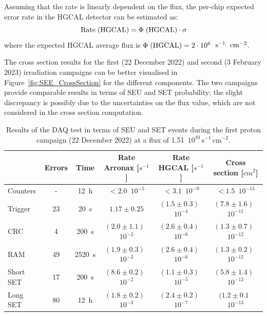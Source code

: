 Assuming that the rate is linearly dependent on the flux, the per-chip expected error rate in the HGCAL detector can be estimated as:
\begin{equation}
    \textnormal{Rate}\;(\textnormal{HGCAL}) = \Phi\;(\textnormal{HGCAL}) \cdot \sigma
\end{equation}
where the expected HGCAL average flux is $\Phi\;(\textnormal{HGCAL})=2\cdot10^6$~$\textnormal{s}^{-1}$~$\textnormal{cm}^{-2}$.

The cross section results for the first (22 December 2022) and second (3 February 2023) irradiation campaigns can be better visualised in Figure~\ref{fig:SEE_CrossSection} for the different components. The two campaigns provide comparable results in terms of SEU and SET probability; the slight discrepancy is possibly due to the uncertainties on the flux value, which are not considered in the cross section computation.

\begin{table}
    \centering
    \begin{tabular}{ l | c | c | c | c | c }
        \hline
        \hline
        & Errors & Time & Rate Arronax [$s^{-1}$] & Rate HGCAL [$s^{-1}$] & Cross section [$cm^{2}$]\\
        \hline
        Counters & - & 12~h & $<2.0$~$10^{-5}$ & $<3.1$~$10^{-9}$ & $<1.5$~$10^{-15}$\\
        Trigger & 23 & 20~s & $1.17\pm0.25$ & $(1.5\pm0.3)$~$10^{-4}$ & $(7.8\pm1.6)$~$10^{-11}$ \\
        CRC & 4 & 200~s & $(2.0\pm1.1)$~$10^{-2}$ & $(2.6\pm0.4)$~$10^{-6}$ & $(1.3\pm0.7)$~$10^{-12}$\\
        RAM & 49 & 2520~s & $(1.9\pm0.3)$~$10^{-2}$ & $(2.6\pm0.4)$~$10^{-6}$ & $(1.3\pm0.2)$~$10^{-12}$\\
        Short SET & 17 & 200~s & $(8.6\pm0.2)$~$10^{-2}$ & $(1.1\pm0.3)$~$10^{-5}$ & $(5.8\pm1.4)$~$10^{-12}$ \\
        Long SET & 80 & 12~h & $(1.8\pm0.2)$~$10^{-3}$ & $(2.4\pm0.2)$~$10^{-7}$ & $(1.2\pm0.1$~$10^{-13}$ \\
        \hline
        \hline
    \end{tabular}
    \caption{Results of the DAQ test in terms of SEU and SET events during the first proton campaign (22 December 2022) at a flux of 1.51~$10^{10}\,\textrm{s}^{-1}\,\textrm{cm}^{-2}$.}
    \label{tab:SEE_protons1}
\end{table}

